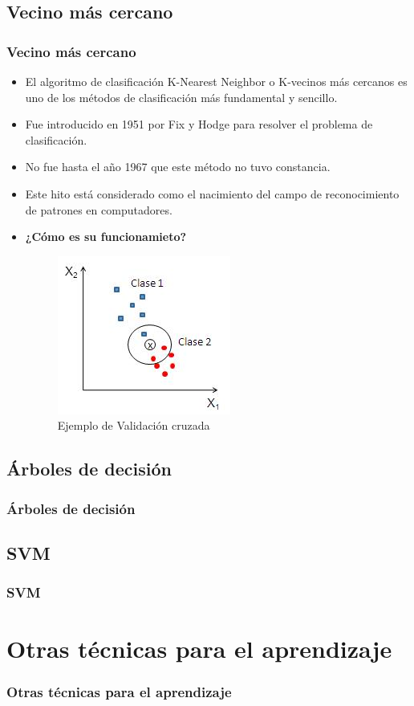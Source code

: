 \documentclass[9pt]{beamer} %
\begin{document}
	\subsection{Vecino más cercano}
		\begin{frame}
		\frametitle{Vecino más cercano}
		\begin{itemize}
		\item El algoritmo de clasificación K-Nearest Neighbor o K-vecinos más cercanos es uno de los métodos de clasificación más fundamental y sencillo.
		\item Fue introducido en 1951 por Fix y Hodge para resolver el problema de clasificación.
		\item No fue hasta el año 1967 que este método no tuvo constancia.
		\item Este hito está considerado como el nacimiento del campo de reconocimiento de patrones en computadores.
		\item \textbf{¿Cómo es su funcionamieto?}
				\begin{figure}[H]
		\includegraphics[scale=0.6]{ejemploKNN} 
		\caption{Ejemplo de Validación cruzada}
	\end{figure}
			\end{itemize}
		\end{frame}
	\subsection{Árboles de decisión}
		\begin{frame}
		\frametitle{Árboles de decisión}
		
		\end{frame}
	\subsection{SVM}
		\begin{frame}
		\frametitle{SVM}
		\end{frame}

\section{Otras técnicas para el aprendizaje}
	\begin{frame}
	\frametitle{Otras técnicas para el aprendizaje}
	\end{frame}
\end{document}
